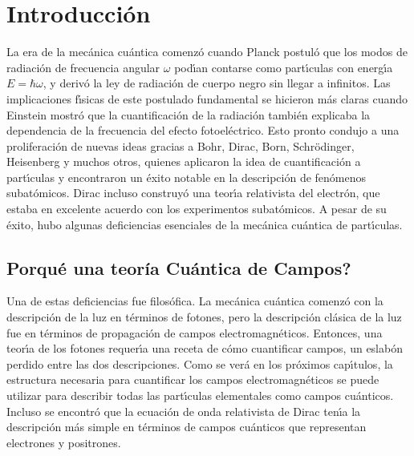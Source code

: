 


\chapter{Introducción}

La era de la mec\'{a}nica cu\'{a}ntica comenz\'{o} cuando Planck postul\'{o} que los modos de radiaci\'{o}n de frecuencia angular $\omega $ pod\'{\i}an contarse como part\'{\i}culas con energ\'{\i}a $E=\hbar \omega $, y deriv\'{o} la ley de radiaci\'{o}n de cuerpo negro sin llegar a infinitos. Las implicaciones f\'{\i}sicas de este postulado fundamental se hicieron m\'{a}s claras cuando Einstein mostr\'{o} que la cuantificaci\'{o}n de la radiaci\'{o}n tambi\'{e}n explicaba la dependencia de la frecuencia del efecto fotoel\'{e}ctrico. Esto pronto condujo a una proliferaci\'{o}n de nuevas ideas gracias a Bohr, Dirac, Born, Schr\"{o}dinger, Heisenberg y muchos otros, quienes aplicaron la idea de cuantificaci\'{o}n a part\'{\i}culas y encontraron un \'{e}xito notable en la descripci\'{o}n de fen\'{o}menos subat\'{o}micos. Dirac incluso construy\'{o} una teor\'{\i}a relativista del electr\'{o}n, que estaba en excelente acuerdo con los experimentos subat\'{o}micos. A pesar de su \'{e}xito, hubo algunas deficiencias esenciales de la mec\'{a}nica cu\'{a}ntica de part\'{\i}culas.

\section{\textquestiondown Porqu\'{e} una teoría Cu\'{a}ntica de Campos?}

Una de estas deficiencias fue filos\'{o}fica. La mec\'{a}nica cu\'{a}ntica comenz\'{o} con la descripci\'{o}n de la luz en t\'{e}rminos de fotones, pero la descripci\'{o}n cl\'{a}sica de la luz fue en t\'{e}rminos de propagaci\'{o}n de campos electromagn\'{e}ticos. Entonces, una teor\'{\i}a de los fotones requer\'{\i}a una receta de c\'{o}mo cuantificar campos, un eslab\'{o}n perdido entre las dos descripciones. Como se ver\'{a} en los pr\'{o}ximos cap\'{\i}tulos, la estructura necesaria para cuantificar los campos electromagn\'{e}ticos se puede utilizar para describir todas las part\'{\i}culas elementales como campos cu\'{a}nticos. Incluso se encontr\'{o} que la ecuaci\'{o}n de onda relativista de Dirac ten\'{\i}a la descripci\'{o}n m\'{a}s simple en t\'{e}rminos de campos cu\'{a}nticos que representan electrones y positrones.

